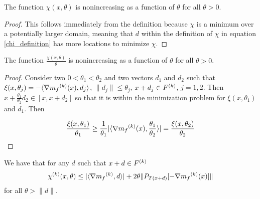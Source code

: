 \documentclass{article}
\begin{document}
\begin{theorem}
\label{chi_non_inc}
\label{12_1_5_1}
The function $\chi(x,\theta)$ is nonincreasing as a function of $\theta$ for all $\theta>0$.
\end{theorem}

\begin{proof}
This follows immediately from the definition because $\chi$ is a minimum over a potentially larger domain, meaning that $d$ within the definition of $\chi$ in equation \ref{chi_definition} has more locations to minimize $\chi$.
\end{proof}

\begin{theorem}
\label{chi_non_inc}
The function $\frac{\chi(x,\theta)}{\theta}$ is nonincreasing as a function of $\theta$ for all $\theta>0$.
\end{theorem}

\begin{proof}
Consider two $0 < \theta_1 < \theta_2$  and two vectors $d_1$ and $d_2$ such that
$\xi(x, \theta_j) = -\langle\nabla {{m}_f}^{(k)}(x), d_j\rangle$, $\|d_j\|\le\theta_j$, $x + d_j \in {F}^{(k)}$, $j=1,2$.
Then $x + \frac {\theta_1}{\theta_2} d_2 \in [x, x + d_2]$ so that it is within the minimization problem for $\xi(x, \theta_1)$ and $d_1$.
Then

\[
\frac{\xi(x, \theta_1)}{\theta_1} \ge \frac 1 {\theta_1} |\langle\nabla{{m}_f}^{(k)}(x), \frac{\theta_1}{\theta_2}\rangle| = \frac{\xi(x, \theta_2)}{\theta_2}
\]

\end{proof}

\begin{theorem}
We have that for any $d$ such that $x + d \in {F}^{(k)}$
\begin{align}
\label{12_1_5_3}
{\chi^{(k)}}(x, \theta) \le |\langle\nabla {{m}_f}^{(k)}, d\rangle| + 2\theta \|P_{T(x+d)}[-\nabla{{m}_f}^{(k)}(x)]\|
\end{align}
for all $\theta > \|d\|$.
\end{theorem}
\end{document}
